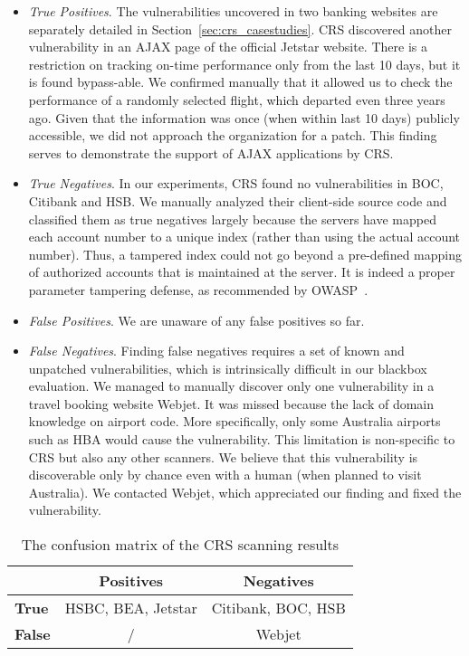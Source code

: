 \documentclass[letter]{sig-alternate-2013}
\begin{document}
\begin{itemize}

\item\textit{True Positives}. The vulnerabilities uncovered in two banking websites are separately detailed in Section~\ref{sec:crs_casestudies}. CRS discovered another vulnerability in an AJAX page of the official Jetstar website. There is a restriction on tracking on-time performance only from the last 10 days, but it is found bypass-able. We confirmed manually that it allowed us to check the performance of a randomly selected flight, which departed even three years ago. Given that the information was once (when within last 10 days) publicly accessible, we did not approach the organization for a patch. This finding serves to demonstrate the support of AJAX applications by CRS.

\item\textit{True Negatives}. In our experiments, CRS found no vulnerabilities in BOC, Citibank and HSB. We manually analyzed their client-side source code and classified them as true negatives largely because the servers have mapped each account number to a unique index (rather than using the actual account number). Thus, a tampered index could not go beyond a pre-defined mapping of authorized accounts that is maintained at the server. It is indeed a proper parameter tampering defense, as recommended by OWASP~\cite{owasp-insecure-direct-object}.

\item\textit{False Positives}. We are unaware of any false positives so far.

\item\textit{False Negatives}. Finding false negatives requires a set of known and unpatched vulnerabilities, which is intrinsically difficult in our blackbox evaluation. We managed to manually discover only one vulnerability in a travel booking website Webjet. It was missed because the lack of domain knowledge on airport code. More specifically, only some Australia airports such as HBA would cause the vulnerability. This limitation is non-specific to CRS but also any other scanners. We believe that this vulnerability is discoverable only by chance even with a human (when planned to visit Australia). We contacted Webjet, which appreciated our finding and fixed the vulnerability.

\end{itemize}

\begin{table}[t]
\centering
\renewcommand{\arraystretch}{1.2}
\caption{The confusion matrix of the CRS scanning results}
\small
\begin{tabular}{l | c c } \hline 
	& \textbf{Positives}		& \textbf{Negatives} \\ \hline
\textbf{True}   & HSBC, BEA, Jetstar 	& Citibank, BOC, HSB  \\
\textbf{False}  & /                     & Webjet \\\hline
\end{tabular}
\label{table:data}
\vspace{-0.5em}
\end{table}
\end{document}
